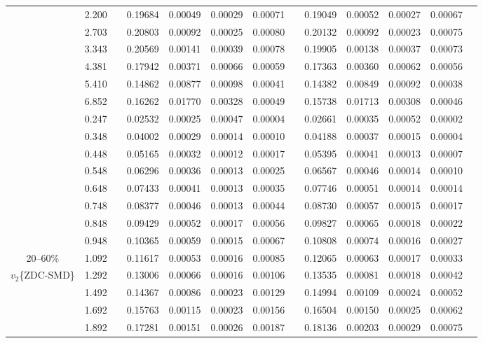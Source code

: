 \documentclass[aps,prc,superscriptaddress,showpacs,floatfix,twocolumn]{revtex4}
\begin{document}
\begin{table}[htbp]
\begin{ruledtabular}
\begin{tabular}{c|cccccccccccc}
 & 2.200 && 0.19684 & 0.00049 & 0.00029 & 0.00071 & & 0.19049 & 0.00052 & 0.00027 & 0.00067 \\ 
 & 2.703 && 0.20803 & 0.00092 & 0.00025 & 0.00080 & & 0.20132 & 0.00092 & 0.00023 & 0.00075 \\ 
 & 3.343 && 0.20569 & 0.00141 & 0.00039 & 0.00078 & & 0.19905 & 0.00138 & 0.00037 & 0.00073 \\ 
 & 4.381 && 0.17942 & 0.00371 & 0.00066 & 0.00059 & & 0.17363 & 0.00360 & 0.00062 & 0.00056 \\ 
 & 5.410 && 0.14862 & 0.00877 & 0.00098 & 0.00041 & & 0.14382 & 0.00849 & 0.00092 & 0.00038 \\ 
 & 6.852 && 0.16262 & 0.01770 & 0.00328 & 0.00049 & & 0.15738 & 0.01713 & 0.00308 & 0.00046 \\ 
\hline
 & 0.247 && 0.02532 & 0.00025 & 0.00047 & 0.00004 & & 0.02661 & 0.00035 & 0.00052 & 0.00002 \\ 
 & 0.348 && 0.04002 & 0.00029 & 0.00014 & 0.00010 & & 0.04188 & 0.00037 & 0.00015 & 0.00004 \\ 
 & 0.448 && 0.05165 & 0.00032 & 0.00012 & 0.00017 & & 0.05395 & 0.00041 & 0.00013 & 0.00007 \\ 
 & 0.548 && 0.06296 & 0.00036 & 0.00013 & 0.00025 & & 0.06567 & 0.00046 & 0.00014 & 0.00010 \\ 
 & 0.648 && 0.07433 & 0.00041 & 0.00013 & 0.00035 & & 0.07746 & 0.00051 & 0.00014 & 0.00014 \\ 
 & 0.748 && 0.08377 & 0.00046 & 0.00013 & 0.00044 & & 0.08730 & 0.00057 & 0.00015 & 0.00017 \\ 
 & 0.848 && 0.09429 & 0.00052 & 0.00017 & 0.00056 & & 0.09827 & 0.00065 & 0.00018 & 0.00022 \\ 
 & 0.948 && 0.10365 & 0.00059 & 0.00015 & 0.00067 & & 0.10808 & 0.00074 & 0.00016 & 0.00027 \\ 
20--60\%
 & 1.092 && 0.11617 & 0.00053 & 0.00016 & 0.00085 & & 0.12065 & 0.00063 & 0.00017 & 0.00033 \\ 
$v_2$\{ZDC-SMD\}
 & 1.292 && 0.13006 & 0.00066 & 0.00016 & 0.00106 & & 0.13535 & 0.00081 & 0.00018 & 0.00042 \\ 
 & 1.492 && 0.14367 & 0.00086 & 0.00023 & 0.00129 & & 0.14994 & 0.00109 & 0.00024 & 0.00052 \\ 
 & 1.692 && 0.15763 & 0.00115 & 0.00023 & 0.00156 & & 0.16504 & 0.00150 & 0.00025 & 0.00062 \\ 
 & 1.892 && 0.17281 & 0.00151 & 0.00026 & 0.00187 & & 0.18136 & 0.00203 & 0.00029 & 0.00075 \\ 

\end{tabular}
\end{ruledtabular}
\end{table}
\end{document}
